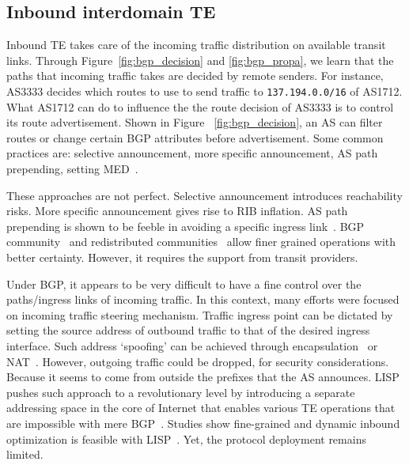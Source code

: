 \subsection{Inbound interdomain TE}
Inbound TE takes care of the incoming traffic distribution on available transit links.
Through Figure~\ref{fig:bgp_decision} and \ref{fig:bgp_propa}, we learn that the paths that incoming traffic takes are decided by remote senders.
For instance, AS3333 decides which routes to use to send traffic to \texttt{137.194.0.0/16} of AS1712.
What AS1712 can do to influence the the route decision of AS3333 is to control its route advertisement.
Shown in Figure ~\ref{fig:bgp_decision}, an AS can filter routes or change certain BGP attributes before advertisement.
Some common practices are: selective announcement, more specific announcement, AS path prepending, setting \ac{MED}~\cite{Wang2008}.

These approaches are not perfect. 
Selective announcement introduces reachability risks.
More specific announcement gives rise to \ac{RIB} inflation. 
AS path prepending is shown to be feeble in avoiding a specific ingress link~\cite{Quoitin2004a}. 
BGP community~\cite{Donnet2008, Shao2015} and redistributed communities~\cite{Quoitin2002} allow finer grained operations with better certainty. 
However, it requires the support from transit providers. 

Under BGP, it appears to be very difficult to have a fine control over the paths/ingress links of incoming traffic. 
In this context, many efforts were focused on incoming traffic steering mechanism.
Traffic ingress point can be dictated by setting the source address of outbound traffic to that of the desired ingress interface.
Such address `spoofing' can be achieved through encapsulation~\cite{Liu2008} or \ac{NAT}~\cite{Sun2015}. However, outgoing traffic could be dropped, for security considerations.
Because it seems to come from outside the prefixes that the AS announces\cite{filtering}.
\ac{LISP} pushes such approach to a revolutionary level by introducing a separate addressing space in the core of Internet that enables various TE operations that are impossible with mere BGP~\cite{lisp}. Studies show fine-grained and dynamic inbound optimization is feasible with \ac{LISP}~\cite{Iannone2007, saucez2011mechanisms, quoitin2007evaluating}.
Yet, the protocol deployment remains limited.

